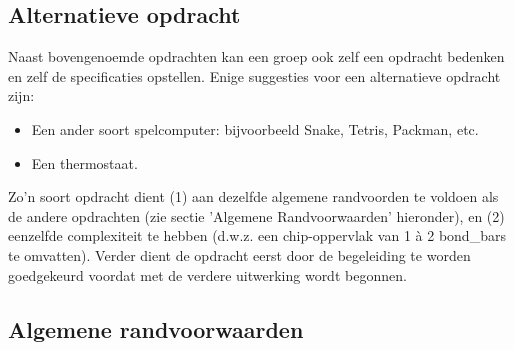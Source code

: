 \subsection{Alternatieve opdracht}
Naast bovengenoemde opdrachten kan een groep ook zelf een opdracht bedenken
en zelf de specificaties opstellen.
Enige suggesties voor een alternatieve opdracht zijn:
\begin{itemize}
\item
Een ander soort spelcomputer: bijvoorbeeld Snake, Tetris, Packman, etc.
\item
Een thermostaat.
\end{itemize}
Zo'n soort opdracht dient (1) aan dezelfde algemene randvoorden te voldoen
als de andere opdrachten (zie sectie 'Algemene Randvoorwaarden' hieronder),
en (2) eenzelfde complexiteit te hebben 
(d.w.z. een chip-oppervlak van 1 \`a 2 bond\_bars te omvatten).
Verder dient de opdracht eerst door de begeleiding te worden 
goedgekeurd voordat met de verdere uitwerking wordt begonnen.

\subsection{Algemene randvoorwaarden}

